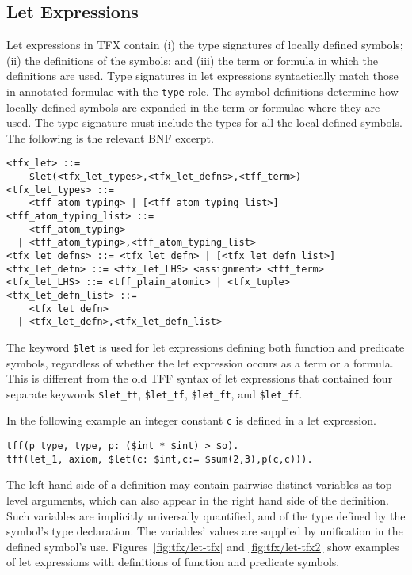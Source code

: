 \subsection{Let Expressions}

Let expressions in TFX contain (i) the type signatures of locally defined 
symbols; (ii) the definitions of the symbols; and (iii) the term or formula
in which the definitions are used. 
Type signatures in let expressions syntactically match those in annotated 
formulae with the \lstinline'type' role. 
The symbol definitions determine how locally defined symbols are expanded 
in the term or formulae where they are used.
The type signature must include the types for all the local defined symbols.
The following is the relevant BNF excerpt.
\begin{lstlisting}[language=bnf]
<tfx_let> ::=
    $let(<tfx_let_types>,<tfx_let_defns>,<tff_term>)
<tfx_let_types> ::=
    <tff_atom_typing> | [<tff_atom_typing_list>]
<tff_atom_typing_list> ::=
    <tff_atom_typing>
  | <tff_atom_typing>,<tff_atom_typing_list>
<tfx_let_defns> ::= <tfx_let_defn> | [<tfx_let_defn_list>]
<tfx_let_defn> ::= <tfx_let_LHS> <assignment> <tff_term>
<tfx_let_LHS> ::= <tff_plain_atomic> | <tfx_tuple>
<tfx_let_defn_list> ::=
    <tfx_let_defn>
  | <tfx_let_defn>,<tfx_let_defn_list>
\end{lstlisting}

The keyword \lstinline'$let' is used for let expressions defining both function and 
predicate symbols, regardless of whether the let expression occurs as a term 
or a formula. 
This is different from the old TFF syntax of let expressions that contained 
four separate keywords \lstinline'$let_tt', \lstinline'$let_tf', \lstinline'$let_ft', and 
\lstinline'$let_ff'.

In the following example an integer constant \lstinline'c' is defined in a let expression.
\begin{lstlisting}[language=tptp]
tff(p_type, type, p: ($int * $int) > $o).
tff(let_1, axiom, $let(c: $int,c:= $sum(2,3),p(c,c))).
\end{lstlisting}

The left hand side of a definition may contain pairwise distinct variables 
as top-level arguments, which can also appear in the right hand side
of the definition.
Such variables are implicitly universally quantified, and of the type 
defined by the symbol's type declaration.
The variables' values are supplied by unification in the defined symbol's use.
Figures~\ref{fig:tfx/let-tfx} and \ref{fig:tfx/let-tfx2} show examples of let expressions with definitions of function and predicate symbols.


